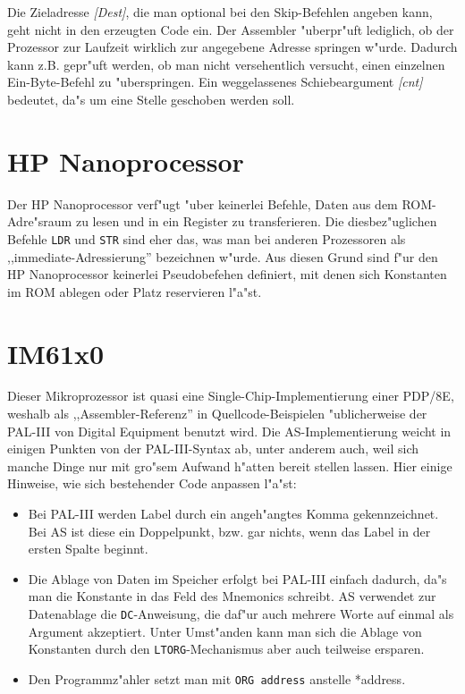 \documentclass[12pt,a4paper,twoside]{report}
\newcommand{\tty}[1]{{\tt #1}}
\newcommand{\asname}{AS}
\begin{document}
Die Zieladresse {\it [Dest]}, die man optional bei den Skip-Befehlen angeben
kann, geht nicht in den erzeugten Code ein.  Der Assembler "uberpr"uft lediglich,
ob der Prozessor zur Laufzeit wirklich zur angegebene Adresse springen w"urde.
Dadurch kann z.B. gepr"uft werden, ob man nicht versehentlich versucht, einen
einzelnen Ein-Byte-Befehl zu "uberspringen.  Ein weggelassenes Schiebeargument
{\it [cnt]} bedeutet, da"s um eine Stelle geschoben werden soll.


\section{HP Nanoprocessor}

Der HP Nanoprocessor verf"ugt "uber keinerlei Befehle, Daten aus dem ROM-
Adre"sraum zu lesen und in ein Register zu transferieren.  Die diesbez"uglichen
Befehle {\tt LDR} und {\tt STR} sind eher das, was man bei anderen Prozessoren
als ,,immediate-Adressierung'' bezeichnen w"urde.  Aus diesen Grund sind f"ur
den HP Nanoprocessor keinerlei Pseudobefehen definiert, mit denen sich Konstanten
im ROM ablegen oder Platz reservieren l"a"st.


\section{IM61x0}

Dieser Mikroprozessor ist quasi eine Single-Chip-Implementierung einer PDP/8E,
weshalb als ,,Assembler-Referenz'' in Quellcode-Beispielen "ublicherweise der
PAL-III von Digital Equipment benutzt wird.  Die \asname{}-Implementierung weicht in
einigen Punkten von der PAL-III-Syntax ab, unter anderem auch, weil sich manche
Dinge nur mit gro"sem Aufwand h"atten bereit stellen lassen.  Hier einige Hinweise,
wie sich bestehender Code anpassen l"a"st:

\begin{itemize}
\item{Bei PAL-III werden Label durch ein angeh"angtes Komma gekennzeichnet.
      Bei \asname{} ist diese ein Doppelpunkt, bzw. gar nichts, wenn das Label in der
      ersten Spalte beginnt.}
\item{Die Ablage von Daten im Speicher erfolgt bei PAL-III einfach dadurch,
      da"s man die Konstante in das Feld des Mnemonics schreibt.  \asname{} verwendet
      zur Datenablage die \tty{DC}-Anweisung, die daf"ur auch mehrere Worte
      auf einmal als Argument akzeptiert.  Unter Umst"anden kann man sich
      die Ablage von Konstanten durch den \tty{LTORG}-Mechanismus aber auch
      teilweise ersparen.}
\item{Den Programmz"ahler setzt man mit \tty{ORG address} anstelle {*address}.}
\end{itemize}
\end{document}
